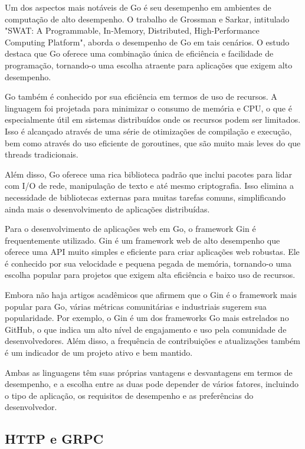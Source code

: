 Um dos aspectos mais notáveis de Go é seu desempenho em ambientes de computação de alto desempenho. O trabalho de Grossman e Sarkar, intitulado "SWAT: A Programmable, In-Memory, Distributed, High-Performance Computing Platform", aborda o desempenho de Go em tais cenários\cite{grossman2016swat}. O estudo destaca que Go oferece uma combinação única de eficiência e facilidade de programação, tornando-o uma escolha atraente para aplicações que exigem alto desempenho.

Go também é conhecido por sua eficiência em termos de uso de recursos. A linguagem foi projetada para minimizar o consumo de memória e CPU, o que é especialmente útil em sistemas distribuídos onde os recursos podem ser limitados. Isso é alcançado através de uma série de otimizações de compilação e execução, bem como através do uso eficiente de goroutines, que são muito mais leves do que threads tradicionais\cite{grossman2016swat}.

Além disso, Go oferece uma rica biblioteca padrão que inclui pacotes para lidar com I/O de rede, manipulação de texto e até mesmo criptografia. Isso elimina a necessidade de bibliotecas externas para muitas tarefas comuns, simplificando ainda mais o desenvolvimento de aplicações distribuídas\cite{grossman2016swat}.

Para o desenvolvimento de aplicações web em Go, o framework Gin é frequentemente utilizado. Gin é um framework web de alto desempenho que oferece uma API muito simples e eficiente para criar aplicações web robustas. Ele é conhecido por sua velocidade e pequena pegada de memória, tornando-o uma escolha popular para projetos que exigem alta eficiência e baixo uso de recursos.

Embora não haja artigos acadêmicos que afirmem que o Gin é o framework mais popular para Go, várias métricas comunitárias e industriais sugerem sua popularidade. Por exemplo, o Gin é um dos frameworks Go mais estrelados no GitHub, o que indica um alto nível de engajamento e uso pela comunidade de desenvolvedores\cite{GinGitHub}. Além disso, a frequência de contribuições e atualizações também é um indicador de um projeto ativo e bem mantido\cite{GinGitHubActivity}.

Ambas as linguagens têm suas próprias vantagens e desvantagens em termos de desempenho, e a escolha entre as duas pode depender de vários fatores, incluindo o tipo de aplicação, os requisitos de desempenho e as preferências do desenvolvedor.

\subsection{HTTP e GRPC}

